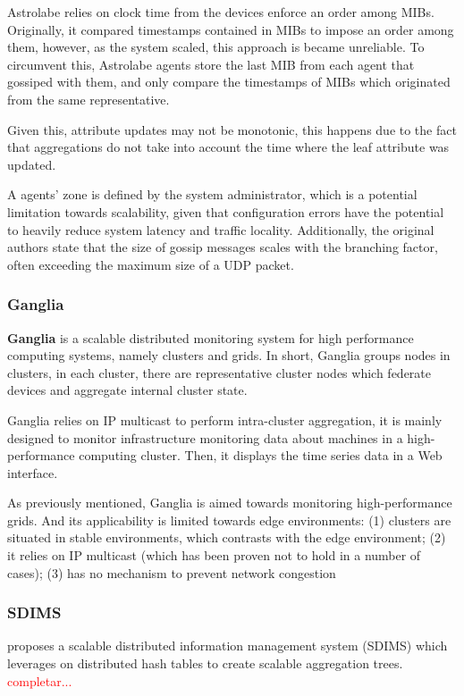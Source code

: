 Astrolabe relies on clock time from the devices enforce an order among MIBs. Originally, it compared timestamps contained in MIBs to impose an order among them, however, as the system scaled, this approach is became unreliable. To circumvent this, Astrolabe agents store the last MIB from each agent that gossiped with them, and only compare the timestamps of MIBs which originated from the same representative.

Given this, attribute updates may not be monotonic, this happens due to the fact that aggregations do not take into account the time where the leaf attribute was updated. 

A agents' zone is defined by the system administrator, which is a potential limitation towards scalability, given that configuration errors have the potential to heavily reduce system latency and traffic locality. Additionally, the original authors state that the size of gossip messages scales with the branching factor, often exceeding the maximum size of a UDP packet. 

\subsubsection{Ganglia}

\textbf{Ganglia} is a scalable distributed monitoring system \cite{massie2004ganglia} for high performance computing systems, namely clusters and grids. In short, Ganglia groups nodes in clusters, in each cluster, there are representative cluster nodes which federate devices and aggregate internal cluster state.

Ganglia relies on IP multicast to perform intra-cluster aggregation, it is mainly designed to monitor infrastructure monitoring data about machines in a high-performance computing cluster. Then, it displays the time series data in a Web interface.

As previously mentioned, Ganglia is aimed towards monitoring high-performance 
grids. And its applicability is limited towards edge environments: (1) clusters are situated in stable environments, which contrasts with the edge environment; (2) it relies on IP multicast (which has been proven not to hold in a number of cases); (3) has no mechanism to prevent network congestion 

\subsubsection{SDIMS}

\cite{10.1145/1030194.1015509} proposes a scalable distributed information management system (SDIMS) which leverages on distributed hash tables to create scalable aggregation trees. \textcolor{red}{completar...}

